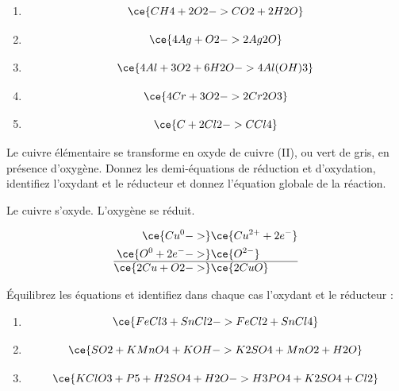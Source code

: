 \documentclass[
  11pt,
  french,
  a4paper,
  openany]{book}
\providecommand{\tightlist}{%
  \setlength{\itemsep}{0pt}\setlength{\parskip}{0pt}}
\begin{document}
\begin{Answer}

\begin{enumerate}
\def\labelenumi{\alph{enumi}.}
\tightlist
\item
  \[
  \ce{CH4 + 2O2 -> CO2 + 2H2O}
  \]
\item
  \[
  \ce{4Ag + O2 -> 2Ag2O}
  \]
\item
  \[
  \ce{4Al + 3O2 + 6H2O -> 4 Al(OH)3}
  \]
\item
  \[
  \ce{4Cr + 3O2 -> 2Cr2O3}
  \]
\item
  \[
  \ce{C + 2Cl2 -> CCl4}
  \]
\end{enumerate}


\end{Answer}

\clearpage

\begin{Exercise}
Le cuivre élémentaire se transforme en oxyde de cuivre (II), ou vert de gris, en présence d'oxygène. Donnez les demi-équations de réduction et d'oxydation, identifiez l'oxydant et le réducteur et donnez l'équation globale de la réaction.

\end{Exercise}

\begin{Answer}
Le cuivre s'oxyde. L'oxygène se réduit.

\[
\begin{split}
\ce{Cu^{0} ->} & \ce{Cu^{2+} + 2 e^-} \\
\ce{O^{0} + 2 e^- ->} & \ce{O^{2-}} \\
\hline
\ce{2 Cu + O2 ->} & \ce{2 CuO}
\end{split}
\]

\end{Answer}

\begin{Exercise}

Équilibrez les équations et identifiez dans chaque cas l'oxydant et le réducteur :

\begin{enumerate}
\def\labelenumi{\alph{enumi}.}
\tightlist
\item
  \[
  \ce{FeCl3 + SnCl2 -> FeCl2 + SnCl4}
  \]
\item
  \[
  \ce{SO2 + KMnO4 + KOH -> K2SO4 + MnO2 + H2O}
  \]
\item
  \[
  \ce{KClO3 + P5 + H2SO4 + H2O -> H3PO4 + K2SO4 + Cl2}
  \]
\end{enumerate}


\end{Exercise}
\end{document}

